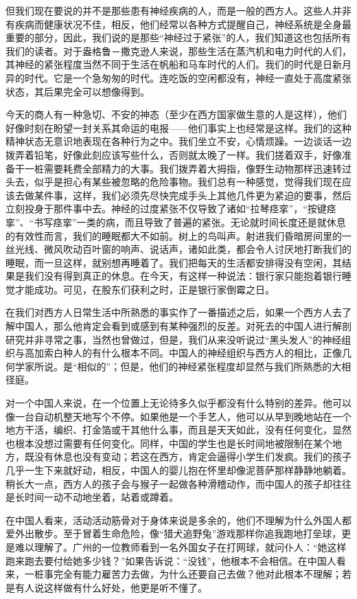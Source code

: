 \documentclass[12pt,oneside]{book}
\begin{document}
\begin{common-format}
但我们现在要说的并不是那些患有神经疾病的人，而是一般的西方人。这些人并非有疾病而健康状况不佳，相反，他们经常以各种方式提醒自己，神经系统是全身最重要的部分，因此，我们说的是那些“神经过于紧张”的人，我们知道这也包括所有我们的读者。对于盎格鲁－撒克逊人来说，那些生活在蒸汽机和电力时代的人们，其神经的紧张程度当然不同于生活在帆船和马车时代的人们。我们的时代是日新月异的时代。它是一个急匆匆的时代。连吃饭的空闲都没有，神经一直处于高度紧张状态，其后果完全可以想像得到。 

今天的商人有一种急切、不安的神态（至少在西方国家做生意的人是这样），他们好像时刻在盼望一封关系其命运的电报——他们事实上也经常是这样。我们的这种精神状态无意识地表现在各种行为之中。我们坐立不安，心情烦躁。一边谈话一边拨弄着铅笔，好像此刻应该写些什么，否则就太晚了一样。我们搓着双手，好像准备干一桩需要耗费全部精力的大事。我们拨弄着大拇指，像野生动物那样迅速转过头去，似乎是担心有某些被忽略的危险事物。我们总有一种感觉，觉得我们现在应该去做某件事，这样，我们必须先尽快完成手头上其他几件更为紧迫的要事，然后立刻投身于那件事中去。神经的过度紧张不仅导致了诸如“拉琴痉挛”，“按键痉挛”、“书写痉挛”一类的病，而且导致了普遍的紧张。无论就时间长度还是就休息的有效性而言，我们的睡眠都大不如前。树上的鸟叫声。射进我们昏暗房间里的一丝光线、微风吹动百叶窗的响声、说话声，诸如此类，都会令人讨厌地打断我们的睡眠，而一旦这样，就别想再睡着了。我们把每天的生活都安排得没有空闲，其结果是我们没有得到真正的休息。在今天，有这样一种说法：银行家只能抱着银行睡觉才能成功。可见，在股东们获利之时，正是银行家倒霉之日。 

在我们对西方人日常生活中所熟悉的事实作了一番描述之后，如果一个西方人去了解中国人，那么他肯定会看到或感到有某种强烈的反差。对死去的中国人进行解剖研究并非寻常之事，当然也曾做过，但是，我们从来没听说过“黑头发人”的神经组织与高加索白种人的有什么根本不同。中国人的神经组织与西方人的相比，正像几何学家所说。是“相似的”；但是，他们的神经紧张程度却显然与我们所熟悉的大相径庭。 

对一个中国人来说，在一个位置上无论待多久似乎都没有什么特别的差异。他可以像一台自动机整天地写个不停。如果他是一个手艺人，他可以从早到晚地站在一个地方干活，编织、打金箔或干其他什么事，而且是天天如此，没有任何变化，显然也根本没想过需要有任何变化。同样，中国的学生也是长时间地被限制在某个地方，既没有休息也没有变动；若这在西方，肯定会逼得小学生们发疯。我们的孩子几乎一生下来就好动，相反，中国人的婴儿抱在怀里却像泥菩萨那样静静地躺着。稍长大一点，西方人的孩子会与猴子一起做各种滑稽动作，而中国人的孩子却往往是长时间一动不动地坐着，站着或蹲着。 

在中国人看来，活动活动筋骨对于身体来说是多余的，他们不理解为什么外国人都爱外出散步。至于冒着生命危险，像“猎犬追野兔”游戏那样你追我跑地打垒球，更是难以理解了。广州的一位教师看到一名外国女子在打网球，就问仆人：“她这样跑来跑去要付给她多少钱？”如果告诉说：“没钱”，他根本不会相信。在中国人看来，一桩事完全有能力雇苦力去做，为什么还要自己去做？他对此根本不理解；若是有人说这样做有什么好处，他更是听不懂了。 


\end{common-format}
\end{document}
